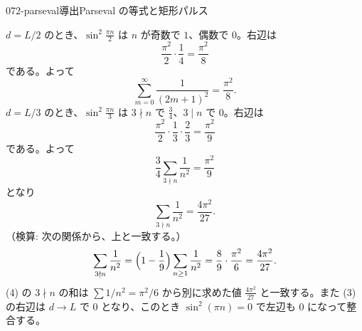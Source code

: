 \documentclass[uplatex,dvipdfmx,a4paper,11pt]{jsarticle}
\begin{document}
\begin{mondai}{072-parseval}{導出}{Parseval の等式と矩形パルス}
\begin{tadashii}
\[\]
 $d=L/2$ のとき、$\sin^{2}\frac{\pi n}{2}$ は $n$ が奇数で $1$、偶数で $0$。右辺は
\[
\frac{\pi^{2}}{2}\cdot\frac{1}{4}=\frac{\pi^{2}}{8}
\]
である。よって
\[
\sum_{m=0}^{\infty}\frac{1}{(2m+1)^{2}}=\frac{\pi^{2}}{8}.
\]
$d=L/3$ のとき、$\sin^{2}\frac{\pi n}{3}$ は $3\nmid n$ で $\frac{3}{4}$、$3\mid n$ で $0$。右辺は
\[
\frac{\pi^{2}}{2}\cdot\frac{1}{3}\cdot\frac{2}{3}=\frac{\pi^{2}}{9}
\]
である。よって
\[
\frac{3}{4}\sum_{3\nmid n}\frac{1}{n^{2}}=\frac{\pi^{2}}{9}
\]
となり
\[
\sum_{3\nmid n}\frac{1}{n^{2}}=\frac{4\pi^{2}}{27}.
\]
（検算: 次の関係から、上と一致する。）
\[
\sum_{3\nmid n}\frac{1}{n^{2}}=\Bigl(1-\frac{1}{9}\Bigr)\sum_{n\ge1}\frac{1}{n^{2}}=\frac{8}{9}\cdot\frac{\pi^{2}}{6}=\frac{4\pi^{2}}{27}.
\]
\kenzan (4) の $3\nmid n$ の和は $\sum1/n^{2}=\pi^{2}/6$ から別に求めた値 $\frac{4\pi^{2}}{27}$ と一致する。また (3) の右辺は $d\to L$ で $0$ となり、このとき $\sin^{2}(\pi n)=0$ で左辺も $0$ になって整合する。
\end{tadashii}
\end{mondai}
\end{document}
